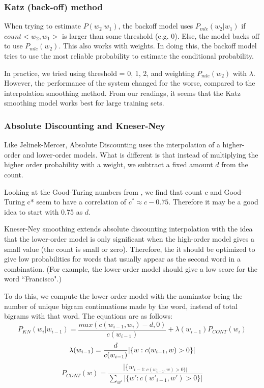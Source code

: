 \documentclass[10pt,twocolumn]{article}
\begin{document}
\subsubsection{Katz (back-off) method}
When trying to estimate $P(w_2|w_1)$, the backoff model\cite{katz1987estimation} uses $P_{mle}(w_2|w_1)$ if $count<w_2,w_1>$ is larger than some threshold (e.g. 0). Else, the model backs off to use $P_{mle}(w_2)$. This also works with weights. In doing this, the backoff model tries to use the most reliable probability to estimate the conditional probability.

In practice, we tried using threshold = 0, 1, 2, and weighting $P_{mle}(w_2)$ with $\lambda$. However, the performance of the system changed for the worse, compared to the interpolation smoothing method. From our readings, it seems that the Katz smoothing model works best for large training sets.
\subsubsection{Absolute Discounting and Kneser-Ney}
Like Jelinek-Mercer, Absolute Discounting uses the interpolation of a higher-order and lower-order models. What is different is that instead of multiplying the higher order probability with a weight, we subtract a fixed amount $d$ from the count. 

Looking at the Good-Turing numbers from \cite{church1991comparison}, we find that count c and Good-Turing c* seem to have a correlation of $c^*\approx c-0.75$. Therefore it may be a good idea to start with 0.75 as $d$.

Kneser-Ney smoothing extends absolute discounting interpolation with the idea that the lower-order model is only significant when the high-order model gives a small value (the count is small or zero). Therefore, the it should be optimized to give low probabilities for words that usually appear as the second word in a combination. (For example, the lower-order model should give a low score for the word ``Francisco".)

To do this, we compute the lower order model with the nominator being the number of unique bigram continuations made by the word, instead of total bigrams with that word. The equations are as follows:
\begin{equation*}
P_{KN}(w_i|w_{i-1})=\frac{max(c(w_{i-1},w_i)-d,0)}{c(w_{i-1})}+\lambda(w_{i-1})P_{CONT}(w_i)
\end{equation*}
\begin{equation*}
\lambda(w_{i-1}) = \frac{d}{c(w_{i-1})}|\{w:c(w_{i-1},w)>0\}|\\
\end{equation*}
\begin{equation*}
P_{CONT}(w) = \frac{|\{w_{i-1:c(w_{i-1},w)>0\}|}}{\sum_{w'}|\{w':c(w'_{i-1},w')>0\}|}
\end{equation*}
\end{document}
